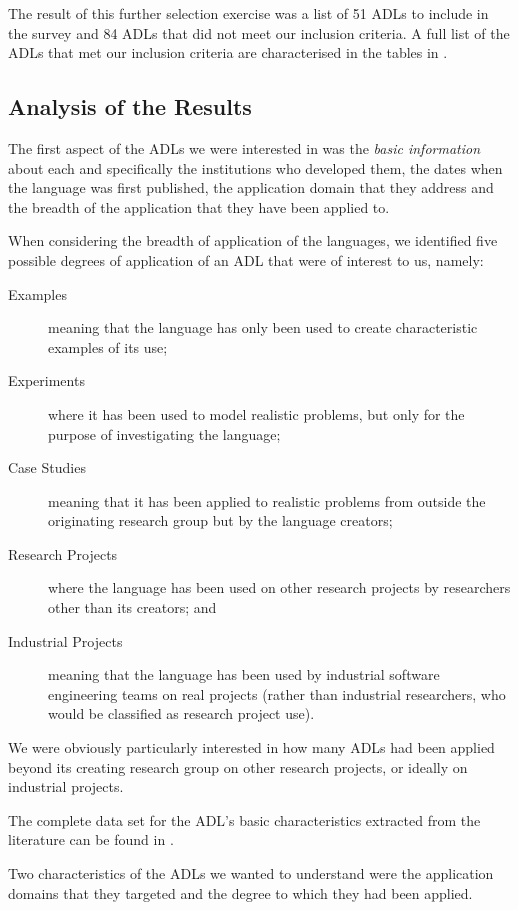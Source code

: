 The result of this further selection exercise was a list of 51 ADLs to include in the survey and 84 ADLs that did not meet our inclusion criteria.  A full list of the ADLs that met our inclusion criteria are characterised in the tables in .

\subsection{Analysis of the Results}

The first aspect of the ADLs we were interested in was the \emph{basic information} about each and specifically the institutions who developed them, the dates when the language was first published, the application domain that they address and the breadth of the application that they have been applied to.

When considering the breadth of application of the languages, we identified five possible degrees of application of an ADL that were of interest to us, namely:
\begin{description}
	\item [Examples] meaning that the language has only been used to create characteristic examples of its use;
	\item [Experiments] where it has been used to model realistic problems, but only for the purpose of investigating the language;
	\item [Case Studies] meaning that it has been applied to realistic problems from outside the originating research group but by the language creators;
	\item [Research Projects] where the language has been used on other research projects by researchers other than its creators; and
	\item[Industrial Projects] meaning that the language has been used by industrial software engineering teams on real projects (rather than industrial researchers, who would be classified as research project use).
\end{description}

We were obviously particularly interested in how many ADLs had been applied beyond its creating research group on other research projects, or ideally on industrial projects.

The complete data set for the ADL's basic characteristics extracted from the literature can be found in .

Two characteristics of the ADLs we wanted to understand were the application domains that they targeted and the degree to which they had been applied.

